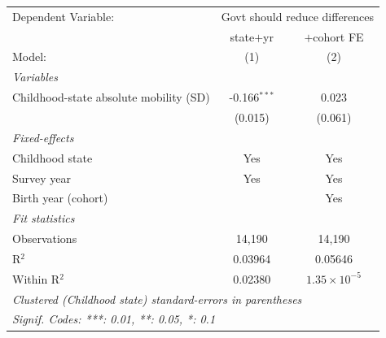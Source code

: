    \begin{tabular}{lcc}
      \tabularnewline \midrule \midrule
      Dependent Variable: & \multicolumn{2}{c}{Govt should reduce differences}\\
                                             & state$+$yr     & $+$cohort FE \\   
      Model:                                 & (1)            & (2)\\  
      \midrule
      \emph{Variables}\\
      Childhood-state absolute mobility (SD) & -0.166$^{***}$ & 0.023\\   
                                             & (0.015)        & (0.061)\\   
      \midrule
      \emph{Fixed-effects}\\
      Childhood state                        & Yes            & Yes\\  
      Survey year                            & Yes            & Yes\\  
      Birth year (cohort)                    &                & Yes\\  
      \midrule
      \emph{Fit statistics}\\
      Observations                           & 14,190         & 14,190\\  
      R$^2$                                  & 0.03964        & 0.05646\\  
      Within R$^2$                           & 0.02380        & $1.35\times 10^{-5}$\\   
      \midrule \midrule
      \multicolumn{3}{l}{\emph{Clustered (Childhood state) standard-errors in parentheses}}\\
      \multicolumn{3}{l}{\emph{Signif. Codes: ***: 0.01, **: 0.05, *: 0.1}}\\
   \end{tabular}
\vspace{3pt}\par{}

